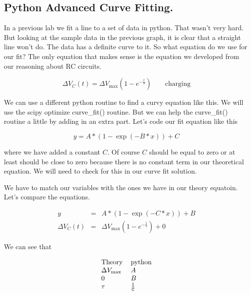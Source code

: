 \subsection{Python Advanced Curve Fitting.}

In a previous lab we fit a line to a set of data in python. That wasn't very hard. But looking at the sample data in the previous graph, it is clear that a straight line won't do.  The data has a definite curve to it. So what equation do we use for our fit? The only equation that makes sense is the equation we developed from our reasoning about RC circuits.

\begin{equation*}
	\Delta V_{C}\left( t\right) =\Delta V_{\max }\left( 1-e^{-\frac{t}{\tau }%
	}\right) \qquad \text{charging}
\end{equation*}

We can use a different python routine to find a curvy equation like this.  We will use the scipy optimize curve\_fit() routine. But we can help the curve\_fit() routine a little by adding in an extra part. Let's code our fit equation like this

\begin{equation*}
	y=A\ast (1-\exp (-B\ast x))+C
\end{equation*}

where we have added a constant $C$. Of course $C$ should be equal to zero or at least should be close to zero because there is no constant term in our theoretical equation. We will need to check for this in our curve fit solution. 



We have to match our variables with the ones we have in our theory equatoin. Let's compare the
equations. 

\begin{eqnarray*}
	y &=&A\ast (1-\exp (-C\ast x))+B \\
	\Delta V_{C}\left( t\right) &=&\Delta V_{\max }\left( 1-e^{-\frac{t}{\tau }%
	}\right) +0
\end{eqnarray*}%

We can see that 

\begin{equation*}
	\begin{tabular}{ll}
	                Theory & python \\ 
		$\Delta V_{\max }$ & $A$ \\ 
	                   $0$ & $B$ \\ 
	               $\tau $ & $\frac{1}{\mathtt{C}}$%
	\end{tabular}
\end{equation*}

